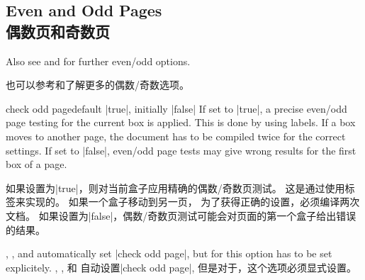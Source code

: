 \subsection{Even and Odd Pages\\偶数页和奇数页}
 
\begin{marker}
Also see  and  for further even/odd options.

也可以参考和了解更多的偶数/奇数选项。
\end{marker}

\begin{docTcbKey}[][doc updated=2015-11-13]{check odd page}{}{default |true|, initially |false|}
If set to |true|, a precise even/odd page testing for the current box is applied. 
This is done by using labels. If a box moves to another page,
the document has to be compiled twice for the correct settings.
If set to |false|, even/odd page tests may give wrong results for the first box of a page.


如果设置为|true|，则对当前盒子应用精确的偶数/奇数页测试。%
这是通过使用标签来实现的。%
如果一个盒子移动到另一页，%
为了获得正确的设置，必须编译两次文档。%
如果设置为|false|，偶数/奇数页测试可能会对页面的第一个盒子给出错误的结果。

 ,
 , and
 automatically set |check odd page|, but for
  this option has to be set explicitely.
,
, 和
自动设置|check odd page|, 但是对于，这个选项必须显式设置。
\end{docTcbKey}


